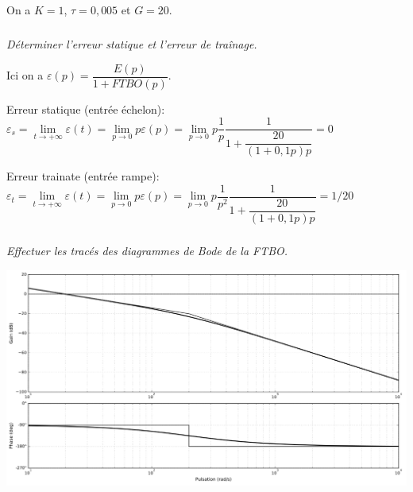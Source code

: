 \documentclass[10pt,fleqn]{article} %
\begin{document}
\begin{multicols}{2}
\fi

On a $K=1$, $\tau = 0,005$ et $G=20$. 
%
%
%
%

\subparagraph{}\textit{Déterminer l'erreur statique et l'erreur de traînage.}

\ifprof
\begin{corrige}
Ici on a $\varepsilon(p)=\dfrac{E(p)}{1+FTBO(p)}$. 

Erreur statique (entrée échelon): $\varepsilon_s 
= \lim\limits_{t\to +\infty} \varepsilon(t)
= \lim\limits_{p\to 0} p\varepsilon(p)
= \lim\limits_{p\to 0} p \dfrac{1}{p}\dfrac{1}{1+\dfrac{20}{(1+0,1p)p}}=0$

Erreur trainate (entrée rampe): $\varepsilon_t
= \lim\limits_{t\to +\infty} \varepsilon(t)
= \lim\limits_{p\to 0} p\varepsilon(p)
= \lim\limits_{p\to 0} p \dfrac{1}{p^2}\dfrac{1}{1+\dfrac{20}{(1+0,1p)p}}=1/20$
\end{corrige}
\else
\fi


\subparagraph{}\textit{Effectuer les tracés des diagrammes de Bode de la FTBO.}
\ifprof
\begin{corrige}

\begin{center}
\includegraphics[width=\linewidth]{images/cor_01}
\end{center}
\end{corrige}
\else
\fi



\end{multicols}
\end{document}
